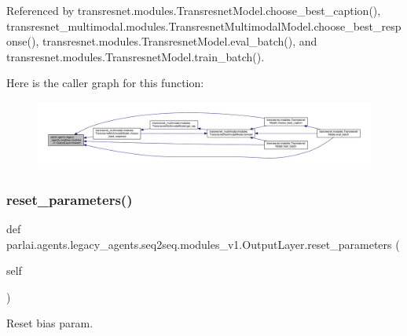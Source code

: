 Referenced by transresnet.\+modules.\+Transresnet\+Model.\+choose\+\_\+best\+\_\+caption(), transresnet\+\_\+multimodal.\+modules.\+Transresnet\+Multimodal\+Model.\+choose\+\_\+best\+\_\+response(), transresnet.\+modules.\+Transresnet\+Model.\+eval\+\_\+batch(), and transresnet.\+modules.\+Transresnet\+Model.\+train\+\_\+batch().

Here is the caller graph for this function\+:
\nopagebreak
\begin{figure}[H]
\begin{center}
\leavevmode
\includegraphics[width=350pt]{classparlai_1_1agents_1_1legacy__agents_1_1seq2seq_1_1modules__v1_1_1OutputLayer_ad631d05ca77591036d35f3ce70a4fe4f_icgraph}
\end{center}
\end{figure}
\mbox{\label{classparlai_1_1agents_1_1legacy__agents_1_1seq2seq_1_1modules__v1_1_1OutputLayer_a0e8baf4ecbc8a3ff9e6a04aa313e7021}} 
\subsubsection{\texorpdfstring{reset\+\_\+parameters()}{reset\_parameters()}}
{\footnotesize\ttfamily def parlai.\+agents.\+legacy\+\_\+agents.\+seq2seq.\+modules\+\_\+v1.\+Output\+Layer.\+reset\+\_\+parameters (\begin{DoxyParamCaption}\item[{}]{self }\end{DoxyParamCaption})}

\begin{DoxyVerb}Reset bias param.\end{DoxyVerb}
 

